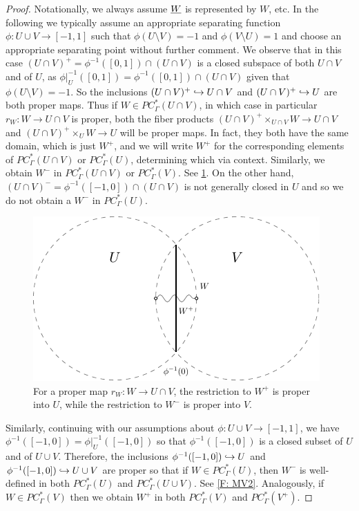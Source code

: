 \begin{proof}
Notationally, we always assume $\underline{W}$ is represented by $W$, etc.
In the following we typically assume an appropriate separating function $\phi:U \cup V \to [-1,1]$ such that $\phi(U\setminus V) = -1$ and $\phi(V\setminus U) = 1$ and choose an appropriate separating point without further comment. We observe that in this case $(U \cap V)^+ = \phi^{-1}([0,1])\cap(U \cap V)$ is a closed subspace of both $U \cap V$ and of $U$, as $\phi|_U^{-1}([0,1]) = \phi^{-1}([0,1]) \cap (U \cap V)$ given that $\phi(U\setminus V) = -1$. So the inclusions $(U \cap V)^+\hookrightarrow U \cap V$ and $(U \cap V)^+\hookrightarrow U$ are both proper maps. Thus if $W \in PC^*_\Gamma(U \cap V)$, in which case in particular $r_W \colon W \to U \cap V$ is proper, both the fiber products $(U \cap V)^+\times_{U \cap V} W \to U \cap V$ and $(U \cap V)^+\times_{U} W \to U$ will be proper maps. In fact, they both have the same domain, which is just $W^+$, and we will write $W^+$ for the corresponding elements of $PC^*_\Gamma(U \cap V)$ or $PC^*_\Gamma(U)$, determining which via context. Similarly, we obtain $W^-$ in $PC^*_\Gamma(U \cap V)$ or $PC^*_\Gamma(V)$. See \cref{F: MV1}. On the other hand, $(U \cap V)^- = \phi^{-1}([-1,0])\cap(U \cap V)$ is not generally closed in $U$ and so we do not obtain a $W^-$ in $PC^*_\Gamma(U)$.

\begin{figure}[h]
	\includegraphics[scale = 1]{figures/mayer_vietoris1.pdf}
	\caption{For a proper map $r_W \colon W \to U \cap V$, the restriction to $W^+$ is proper into $U$, while the restriction to $W^-$ is proper into $V$. }
\label{F: MV1}
\end{figure}




Similarly, continuing with our assumptions about $\phi:U \cup V \to [-1,1]$, we have $\phi^{-1}([-1,0]) = \phi|_U^{-1}([-1,0])$ so that $\phi^{-1}([-1,0])$ is a closed subset of $U$ and of $U \cup V$. Therefore, the inclusions $\phi^{-1}([-1,0])\hookrightarrow U$ and $\phi^{-1}([-1,0])\hookrightarrow U \cup V$ are proper so that if $W \in PC^*_\Gamma(U)$, then $W^-$ is well-defined in both $PC^*_\Gamma(U)$ and $PC^*_\Gamma(U \cup V)$. See \cref{F: MV2}. Analogously, if $W \in PC^*_\Gamma(V)$ then we obtain $W^+$ in both $PC^*_\Gamma(V)$ and $PC^*_\Gamma(V^+)$.



\end{proof}
